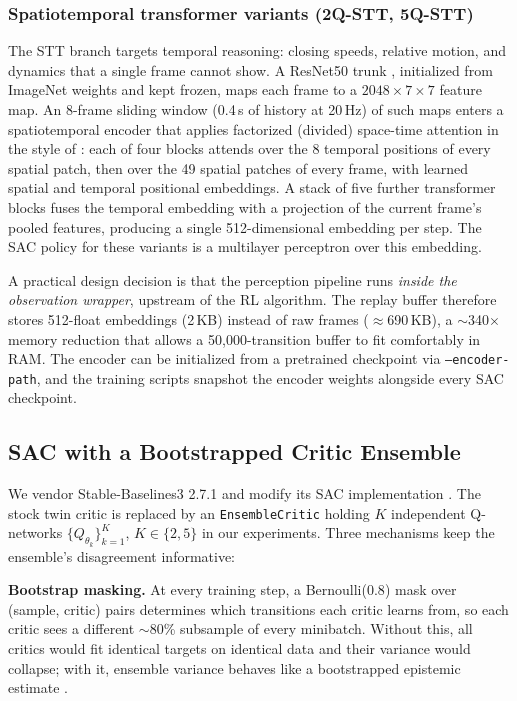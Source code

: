 \documentclass[conference]{IEEEtran}
\begin{document}
\subsubsection{Spatiotemporal transformer variants (2Q-STT, 5Q-STT)}
The STT branch targets temporal reasoning: closing speeds, relative motion, and dynamics that a single frame cannot show. A ResNet50 trunk \cite{he2016resnet}, initialized from ImageNet weights \cite{deng2009imagenet} and kept frozen, maps each frame to a $2048{\times}7{\times}7$ feature map. An 8-frame sliding window (0.4\,s of history at 20\,Hz) of such maps enters a spatiotemporal encoder that applies factorized (divided) space-time attention in the style of \cite{vaswani2017attention}: each of four blocks attends over the 8 temporal positions of every spatial patch, then over the 49 spatial patches of every frame, with learned spatial and temporal positional embeddings. A stack of five further transformer blocks fuses the temporal embedding with a projection of the current frame's pooled features, producing a single 512-dimensional embedding per step. The SAC policy for these variants is a multilayer perceptron over this embedding.

A practical design decision is that the perception pipeline runs \emph{inside the observation wrapper}, upstream of the RL algorithm. The replay buffer therefore stores 512-float embeddings (2\,KB) instead of raw frames ($\approx$690\,KB), a $\sim$340$\times$ memory reduction that allows a 50{,}000-transition buffer to fit comfortably in RAM. The encoder can be initialized from a pretrained checkpoint via \texttt{--encoder-path}, and the training scripts snapshot the encoder weights alongside every SAC checkpoint.

\subsection{SAC with a Bootstrapped Critic Ensemble}
\label{sec:sb3}
We vendor Stable-Baselines3 2.7.1 \cite{raffin2021sb3} and modify its SAC implementation \cite{haarnoja2018sac}. The stock twin critic is replaced by an \texttt{EnsembleCritic} holding $K$ independent Q-networks $\{Q_{\theta_k}\}_{k=1}^{K}$, $K \in \{2, 5\}$ in our experiments. Three mechanisms keep the ensemble's disagreement informative:

\textbf{Bootstrap masking.} At every training step, a Bernoulli($0.8$) mask over (sample, critic) pairs determines which transitions each critic learns from, so each critic sees a different $\sim$80\% subsample of every minibatch. Without this, all critics would fit identical targets on identical data and their variance would collapse; with it, ensemble variance behaves like a bootstrapped epistemic estimate \cite{lakshminarayanan2017ensembles}.
\end{document}
